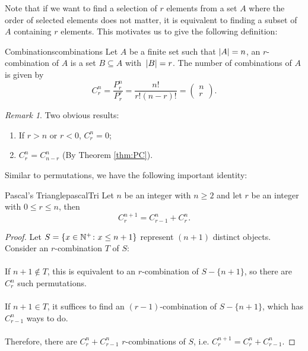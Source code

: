 \documentclass[math]{amznotes}
\theoremstyle{remark}
\newtheorem*{remark}{Remark}
\begin{document}
Note that if we want to find a selection of $r$ elements from a set $A$ where the order of selected elements does not matter, it is equivalent to finding a subset of $A$ containing $r$ elements. This motivates us to give the following definition:
\begin{dfnbox}{Combinations}{combinations}
    Let $A$ be a finite set such that ${\left\lvert {A} \right\rvert} = n$, an $r$-combination of $A$ is a set $B \subseteq A$ with~${\left\lvert {B} \right\rvert} = r$. The number of combinations of $A$ is given by
    \begin{equation*}
        C^n_r = \frac{P^n_r}{P^r_r} = \frac{n!}{r!(n - r)!} = \begin{pmatrix}
            n \\
            r
        \end{pmatrix}.
    \end{equation*}
\end{dfnbox}
\begin{notebox}
    \begin{remark}
        Two obvious results:
        \begin{enumerate}
            \item If $r > n$ or $r < 0$, $C^n_r = 0$;
            \item $C^n_r = C^n_{n - r}$ (By Theorem \ref{thm:PC}).
        \end{enumerate}
    \end{remark}
\end{notebox}
Similar to permutations, we have the following important identity:
\begin{thmbox}{Pascal's Triangle}{pascalTri}
    Let $n$ be an integer with $n \geq 2$ and let $r$ be an integer with $0 \leq r \leq n$, then
    \begin{equation*}
        C^{n + 1}_r = C^{n}_{r - 1} + C^{n}_r.
    \end{equation*}
    \tcblower
    \begin{proof}
        Let $S = \left\{x \in \mathbb{N}^+ \colon x \leq n + 1\right\}$ represent $(n + 1)$ distinct objects. Consider an $r$-combination $T$ of $S$:
        \\\\
        If $n + 1 \notin T$, this is equivalent to an $r$-combination of $S - \{n + 1\}$, so there are $C^n_r$ such permutations.
        \\\\
        If $n + 1 \in T$, it suffices to find an $(r - 1)$-combination of $S - \{n + 1\}$, which has $C^n_{r - 1}$ ways to do.
        \\\\
        Therefore, there are $C^n_{r} + C^n_{r - 1}$ $r$-combinations of $S$, i.e. $C^{n + 1}_r = C^n_r + C^n_{r - 1}$. 
    \end{proof}
\end{thmbox}
\end{document}
